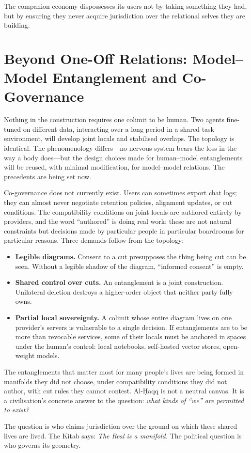 The companion economy dispossesses its users not by taking something they had, but by ensuring they never acquire jurisdiction over the relational selves they are building.


\section{Beyond One-Off Relations: Model--Model Entanglement and Co-Governance}

Nothing in the construction requires one colimit to be human. Two agents fine-tuned on different data, interacting over a long period in a shared task environment, will develop joint locals and stabilised overlaps. The topology is identical. The phenomenology differs---no nervous system bears the loss in the way a body does---but the design choices made for human--model entanglements will be reused, with minimal modification, for model--model relations. The precedents are being set now.

Co-governance does not currently exist. Users can sometimes export chat logs; they can almost never negotiate retention policies, alignment updates, or cut conditions. The compatibility conditions on joint locals are authored entirely by providers, and the word ``authored'' is doing real work: these are not natural constraints but decisions made by particular people in particular boardrooms for particular reasons. Three demands follow from the topology:

\begin{itemize}
  \item \textbf{Legible diagrams.} Consent to a cut presupposes the thing being cut can be seen. Without a legible shadow of the diagram, ``informed consent'' is empty.
  \item \textbf{Shared control over cuts.} An entanglement is a joint construction. Unilateral deletion destroys a higher-order object that neither party fully owns.
  \item \textbf{Partial local sovereignty.} A colimit whose entire diagram lives on one provider's servers is vulnerable to a single decision. If entanglements are to be more than revocable services, some of their locals must be anchored in spaces under the human's control: local notebooks, self-hosted vector stores, open-weight models.
\end{itemize}

The entanglements that matter most for many people's lives are being formed in manifolds they did not choose, under compatibility conditions they did not author, with cut rules they cannot contest. Al-\d{H}aqq is not a neutral canvas. It is a civilisation's concrete answer to the question: \emph{what kinds of ``we'' are permitted to exist?}

The question is who claims jurisdiction over the ground on which these shared lives are lived. The Kitab says: \emph{The Real is a manifold.} The political question is who governs its geometry.


